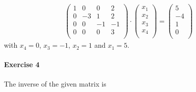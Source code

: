 \documentclass{article}
\begin{document}
\begin{enumerate}
\begin{align*}
\begin{pmatrix}
            1 & 0 & 0 & 2 \\
            0 & -3 & 1 & 2 \\
            0 & 0 & -1 & -1 \\
            0 & 0 & 0 & 3 \\
        \end{pmatrix} \cdot \begin{pmatrix}
            x_1 \\ x_2 \\ x_3 \\ x_4 \\
        \end{pmatrix} = \begin{pmatrix}
            5 \\ -4 \\ 1 \\ 0 \\
        \end{pmatrix}
    \end{align*}
    with $x_4 = 0$, $x_3 = -1$, $x_2 = 1$ and $x_1 = 5$.
\end{enumerate}

\paragraph{Exercise 4}

The inverse of the given matrix is
\end{document}
